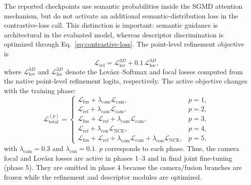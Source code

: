 The reported checkpoints use semantic probabilities inside the SGMD attention mechanism, but do not activate an additional semantic-distribution loss in the contrastive-loss call. This distinction is important: semantic guidance is architectural in the evaluated model, whereas descriptor discrimination is optimized through Eq.~\ref{eq:contrastive-loss}. The point-level refinement objective is
\begin{equation}
	\mathcal{L}_{\mathrm{ref}}
	=
	\mathcal{L}^{3D}_{\mathrm{lov}}
	+0.1\,\mathcal{L}^{3D}_{\mathrm{foc}},
\end{equation}
where $\mathcal{L}^{3D}_{\mathrm{lov}}$ and $\mathcal{L}^{3D}_{\mathrm{foc}}$ denote the Lov\'asz--Softmax and focal losses computed from the native point-level refinement logits, respectively. The active objective changes with the training phase:
\begin{equation}
\mathcal{L}^{(p)}_{\mathrm{total}}
=
\begin{cases}
\mathcal{L}_{\mathrm{fus}}+\lambda_{\mathrm{cam}}\mathcal{L}_{\mathrm{cam}},
& p=1,\\
\mathcal{L}_{\mathrm{ref}}+\lambda_{\mathrm{cam}}\mathcal{L}_{\mathrm{cam}},
& p=2,\\
\mathcal{L}_{\mathrm{fus}}+\mathcal{L}_{\mathrm{ref}}
 +\lambda_{\mathrm{cam}}\mathcal{L}_{\mathrm{cam}},
& p=3,\\
\mathcal{L}_{\mathrm{ref}}+\lambda_{\mathrm{con}}\mathcal{L}_{\mathrm{NCE}},
& p=4,\\
\mathcal{L}_{\mathrm{fus}}+\mathcal{L}_{\mathrm{ref}}
 +\lambda_{\mathrm{cam}}\mathcal{L}_{\mathrm{cam}}
 +\lambda_{\mathrm{con}}\mathcal{L}_{\mathrm{NCE}},
& p=5,
\end{cases}
\label{eq:phase-dependent-total-loss}
\end{equation}
with $\lambda_{\mathrm{cam}}=0.3$ and $\lambda_{\mathrm{con}}=0.1$. $p$ corresponds to each phase. Thus, the camera focal and Lov\'asz losses are active in phases 1--3 and in final joint fine-tuning (phase 5). They are omitted in phase 4 because the camera/fusion branches are frozen while the refinement and descriptor modules are optimized.
